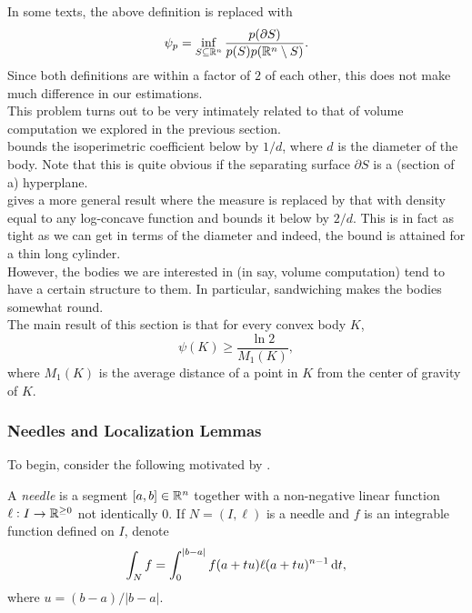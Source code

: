 		In some texts, the above definition is replaced with
		\[ \psi_p = \inf_{S\subseteq\mathbb{R}^n} \frac{p(\partial S)}{p(S)p(\mathbb{R}^n\setminus S)}. \]
		Since both definitions are within a factor of $2$ of each other, this does not make much difference in our estimations.\\

		This problem turns out to be very intimately related to that of volume computation we explored in the previous section.\\
		\cite{lovasz-simonovits-mixing-rate-isoperimetric} bounds the isoperimetric coefficient below by $1/d$, where $d$ is the diameter of the body. Note that this is quite obvious if the separating surface $\partial S$ is a (section of a) hyperplane.\\
		\cite{applegate-kannan-cube-sandwich} gives a more general result where the measure is replaced by that with density equal to any log-concave function and bounds it below by $2/d$. This is in fact as tight as we can get in terms of the diameter and indeed, the bound is attained for a thin long cylinder.\\
		However, the bodies we are interested in (in say, volume computation) tend to have a certain structure to them. In particular, sandwiching makes the bodies somewhat round.\\
		The main result of this section is that for every convex body $K$,
		\[ \psi(K) \geq \frac{\ln 2}{M_1(K)}, \]
		where $M_1(K)$ is the average distance of a point in $K$ from the center of gravity of $K$. 

	\subsubsection{Needles and Localization Lemmas}
	\label{sec: 5.1.2}

		To begin, consider the following motivated by .

		\begin{definition}
			A \textit{needle} is a segment $[a,b]\in\mathbb{R}^n$ together with a non-negative linear function $\ell:I\to\mathbb{R}^{\geq 0}$ not identically $0$. If $N=(I,\ell)$ is a needle and $f$ is an integrable function defined on $I$, denote
			\[ \int_N f = \int_{0}^{|b-a|} f(a+tu)\ell(a+tu)^{n-1} \operatorname{d}\!{t}, \]
			where $u=(b-a)/|b-a|$.
		\end{definition}

